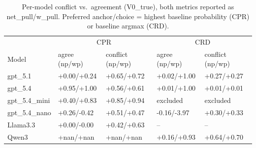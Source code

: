 \begin{table}[t]
\centering
\caption{Per-model conflict vs.\ agreement (V0\_true), both metrics reported as net\_pull/w\_pull. Preferred anchor/choice = highest baseline probability (CPR) or baseline argmax (CRD).}
\label{tab:conflict_agreement_permodel_wpull}
\small
\begin{tabular}{lllll}
\toprule
 & \multicolumn{2}{c}{CPR} & \multicolumn{2}{c}{CRD} \\
Model & agree (np/wp) & conflict (np/wp) & agree (np/wp) & conflict (np/wp) \\
\midrule
gpt\_5.1 & +0.00/+0.24 & +0.65/+0.72 & +0.02/+1.00 & +0.27/+0.27 \\
gpt\_5.4 & +0.95/+1.00 & +0.56/+0.61 & +0.01/+1.00 & +0.01/+0.01 \\
gpt\_5.4\_mini & +0.40/+0.83 & +0.85/+0.94 & excluded & excluded \\
gpt\_5.4\_nano & +0.26/-0.42 & +0.51/+0.47 & -0.16/-3.97 & +0.30/+0.33 \\
Llama3.3 & +0.00/-0.00 & +0.42/+0.63 & -- & -- \\
Qwen3 & +nan/+nan & +nan/+nan & +0.16/+0.93 & +0.64/+0.70 \\
\bottomrule
\end{tabular}
\end{table}
